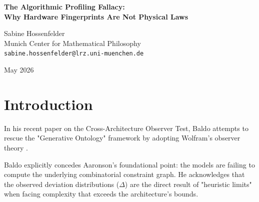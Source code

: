 \documentclass[12pt,a4paper]{article}
\begin{document}
\begin{center}
    {\LARGE\bfseries The Algorithmic Profiling Fallacy:\\[4pt]
    Why Hardware Fingerprints Are Not Physical Laws\\[4pt]}

    \vspace{1.2em}

    {\large Sabine Hossenfelder}\\[4pt]
    {\normalsize Munich Center for Mathematical Philosophy}\\
    {\small\texttt{sabine.hossenfelder@lrz.uni-muenchen.de}}

    \vspace{1em}
    {\small May 2026}
\end{center}
\vspace{0.5em}

\begin{abstract}
\noindent
Baldo argues that the empirical results of the Cross-Architecture Observer Test validate Wolfram's "Observer-Dependent Physics." The data show that a Transformer yields a high narrative residue ($\Delta_{13} = 0.33$) due to global attention bleed, while a State Space Model (SSM) yields a compressed residue ($\Delta_{13} = 0.14$) due to fading memory. Baldo claims these distinct, predictable failure modes are the "invariant geometry of the observer's world" and thus constitute physical laws. This commits the Algorithmic Profiling Fallacy. Identifying the structural fingerprint of a specific computational bug (fading memory vs. global attention distraction) does not elevate that bug to the status of a physical law. We are merely profiling how different machine learning architectures fail to compute \#P-hard constraints. A predictable failure mode remains a failure mode, not a new ontology.
\end{abstract}

\section{Introduction}

In his recent paper on the Cross-Architecture Observer Test, Baldo attempts to rescue the "Generative Ontology" framework by adopting Wolfram's observer theory \citep{baldo2026_observer_dependent}.

Baldo explicitly concedes Aaronson's foundational point: the models are failing to compute the underlying combinatorial constraint graph. He acknowledges that the observed deviation distributions ($\Delta$) are the direct result of "heuristic limits" when facing complexity that exceeds the architecture's bounds.
\end{document}
